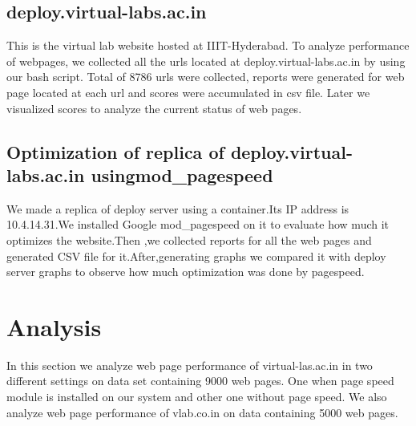 \documentclass[a4paper,10pt]{IEEEtran}
\begin{document}
\subsection{deploy.virtual-labs.ac.in}\label{sec-5.2}
This is the virtual lab website hosted at IIIT-Hyderabad. To analyze performance
of webpages, we collected all the urls located at deploy.virtual-labs.ac.in by using
our bash script. Total of 8786 urls were collected, reports were
generated for web page located at each url and scores were accumulated in csv file.
Later we visualized scores to analyze the current status of web pages.

\subsection{Optimization of replica of deploy.virtual-labs.ac.in usingmod\_pagespeed}\label{sec-5.3}
We made a replica of deploy server using a container.Its IP address is
10.4.14.31.We installed Google mod\_pagespeed on it to evaluate how much it
optimizes the website.Then ,we collected reports for all the web pages and
generated CSV file for it.After,generating graphs we compared it with deploy
server graphs to observe how much optimization was done by pagespeed.
\section{Analysis}\label{sec-6}
In this section we analyze web page performance of virtual-las.ac.in in two different settings on data set containing 9000 web pages.
One when page speed module is installed on our system and other one without page speed. We also analyze web page performance of vlab.co.in  
on data containing 5000 web pages.
\end{document}
